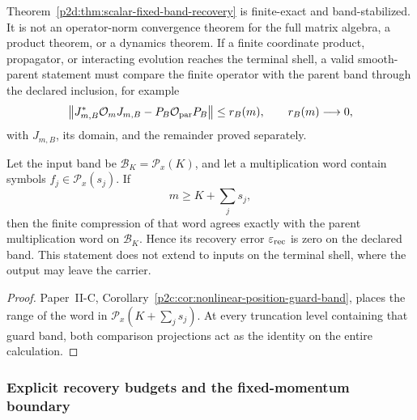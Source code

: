 \documentclass[12pt,a4paper]{article}
\begin{document}
\begin{remark}
\label{p2d:rem:recovery-boundary}
Theorem~\ref{p2d:thm:scalar-fixed-band-recovery} is finite-exact and
band-stabilized.  It is not an operator-norm convergence theorem for the full
matrix algebra, a product theorem, or a dynamics theorem.  If a finite
coordinate product, propagator, or interacting evolution reaches the terminal
shell, a valid smooth-parent statement must compare the finite operator with
the parent band through the declared inclusion, for example
\[
 \bigl\|J_{m,B}^{*}\mathcal O_mJ_{m,B}
       -P_B\mathcal O_{\rm par}P_B\bigr\|
 \le r_B(m),
 \qquad r_B(m)\longrightarrow0,
\]
with \(J_{m,B}\), its domain, and the remainder proved separately.
\end{remark}

\begin{corollary}
\label{p2d:cor:guard-banded-nonlinear-recovery}
Let the input band be \(\mathcal B_K=\mathcal P_x(K)\), and let a
multiplication word contain symbols
\(f_j\in\mathcal P_x(s_j)\).  If
\[
 m\ge K+\sum_j s_j,
\]
then the finite compression of that word agrees exactly with the parent
multiplication word on \(\mathcal B_K\).  Hence its recovery error
\(\varepsilon_{\rm rec}\) is zero on the declared band.  This statement does
not extend to inputs on the terminal shell, where the output may leave the
carrier.
\end{corollary}

\begin{proof}
Paper~II-C, Corollary~\ref{p2c:cor:nonlinear-position-guard-band}, places the
range of the word in
\(\mathcal P_x(K+\sum_js_j)\).  At every truncation level containing that
guard band, both comparison projections act as the identity on the entire
calculation.
\end{proof}


\subsubsection{Explicit recovery budgets and the fixed-momentum boundary}
\end{document}
